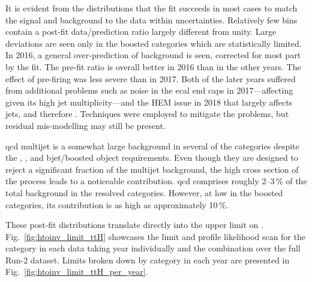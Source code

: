 It is evident from the distributions that the fit succeeds in most cases to match the signal and background to the data within uncertainties. Relatively few bins contain a post-fit data/prediction ratio largely different from unity. Large deviations are seen only in the \ttH boosted categories which are statistically limited. In 2016, a general over-prediction of background is seen, corrected for most part by the fit. The pre-fit ratio is overall better in 2016 than in the other years. The effect of pre-firing was less severe than in 2017. Both of the later years suffered from additional problems such as noise in the \acrshort{ecal} end caps in 2017---affecting \ttH given its high jet multiplicity---and the HEM issue in 2018 that largely affects \glspl{jet}, and therefore \ptvecmiss. Techniques were employed to mitigate the problems, but residual mis-modelling may still be present.

\acrshort{qcd} multijet is a somewhat large background in several of the categories despite the \mindphi, \omegaTilde, and \gls{bjet}/boosted object requirements. Even though they are designed to reject a significant fraction of the multijet background, the high cross section of the process leads to a noticeable contribution. \acrshort{qcd} comprises roughly 2--3\,\% of the total background in the resolved categories. However, at low \ptmiss in the boosted categories, its contribution is as high as approximately 10\,\%.

These post-fit distributions translate directly into the upper limit on \BRHinvFull. Fig.~\ref{fig:htoinv_limit_ttH} showcases the limit and profile likelihood scan for the \ttH category in each data taking year individually and the combination over the full Run-2 dataset. Limits broken down by category in each year are presented in Fig.~\ref{fig:htoinv_limit_ttH_per_year}.

